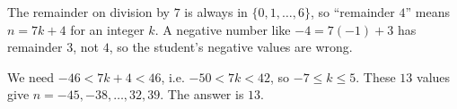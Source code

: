 The remainder on division by $7$ is always in $\{0,1,\dots,6\}$, so ``remainder $4$'' means $n=7k+4$ for an integer $k$. A negative number like $-4=7(-1)+3$ has remainder $3$, not $4$, so the student's negative values are wrong.

We need $-46<7k+4<46$, i.e. $-50<7k<42$, so $-7\le k\le5$. These $13$ values give $n=-45,-38,\dots,32,39$. The answer is $\boxed{13}$.
